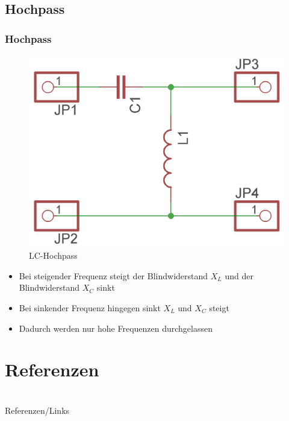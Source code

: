 \subsection*{Hochpass}
\begin{frame}
  \frametitle{Hochpass}
  \begin{center}
    \begin{figure}
      \includegraphics[width=\textwidth,height=.45\textheight,keepaspectratio]{e07/LC-Hochpass.png}
      \caption{LC-Hochpass}
    \end{figure}
  \end{center}
  \begin{itemize}
    \item Bei steigender Frequenz steigt der Blindwiderstand $X_L$ und der Blindwiderstand $X_C$ sinkt
    \item Bei sinkender Frequenz hingegen sinkt $X_L$ und $X_C$ steigt
    \item Dadurch werden nur hohe Frequenzen durchgelassen
  \end{itemize}
\end{frame}


\section*{Referenzen}

\renewcommand{\refname}{Referenzen}

\hypertarget{refs}{}
\textcolor{white}{} \\ %
\Large Referenzen/Links
\footnotesize

